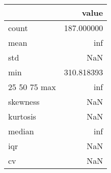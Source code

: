 \begin{tabular}{lr}
\toprule
 & value \\
\midrule
count & 187.000000 \\
mean & inf \\
std & NaN \\
min & 310.818393 \\
25%
50%
75%
max & inf \\
skewness & NaN \\
kurtosis & NaN \\
median & inf \\
iqr & NaN \\
cv & NaN \\
\bottomrule
\end{tabular}
